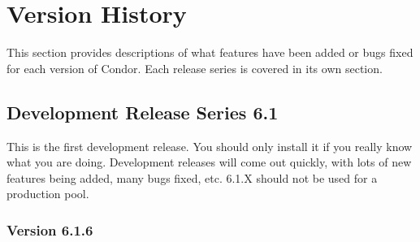 \section{\label{sec:Version-History}Version History}

This section provides descriptions of what features have been added or
bugs fixed for each version of Condor.  
Each release series is covered in its own section.

\subsection{\label{sec:History-6-1}Development Release Series 6.1}

This is the first development release.
You should only install it if you really know what you are doing.
Development releases will come out quickly, with lots of new features
being added, many bugs fixed, etc.  
6.1.X should not be used for a production pool.

\subsubsection{\label{sec:New-6-1-6}Version 6.1.6}

